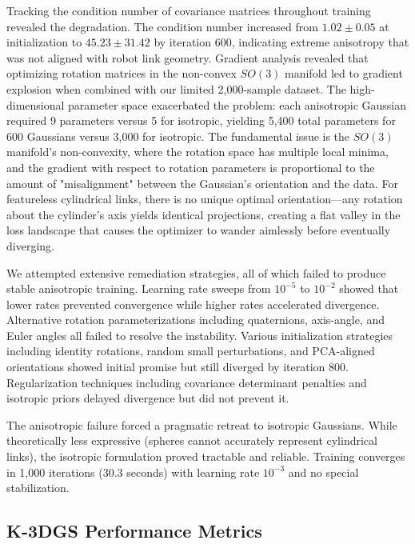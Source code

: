 \documentclass[12pt,a4paper,oneside]{report}
\begin{document}
Tracking the condition number of covariance matrices throughout training revealed the degradation. The condition number increased from $1.02 \pm 0.05$ at initialization to $45.23 \pm 31.42$ by iteration 600, indicating extreme anisotropy that was not aligned with robot link geometry. Gradient analysis revealed that optimizing rotation matrices in the non-convex $SO(3)$ manifold led to gradient explosion when combined with our limited 2,000-sample dataset. The high-dimensional parameter space exacerbated the problem: each anisotropic Gaussian required 9 parameters versus 5 for isotropic, yielding 5,400 total parameters for 600 Gaussians versus 3,000 for isotropic. The fundamental issue is the $SO(3)$ manifold's non-convexity, where the rotation space has multiple local minima, and the gradient with respect to rotation parameters is proportional to the amount of "misalignment" between the Gaussian's orientation and the data. For featureless cylindrical links, there is no unique optimal orientation—any rotation about the cylinder's axis yields identical projections, creating a flat valley in the loss landscape that causes the optimizer to wander aimlessly before eventually diverging.

We attempted extensive remediation strategies, all of which failed to produce stable anisotropic training. Learning rate sweeps from $10^{-5}$ to $10^{-2}$ showed that lower rates prevented convergence while higher rates accelerated divergence. Alternative rotation parameterizations including quaternions, axis-angle, and Euler angles all failed to resolve the instability. Various initialization strategies including identity rotations, random small perturbations, and PCA-aligned orientations showed initial promise but still diverged by iteration 800. Regularization techniques including covariance determinant penalties and isotropic priors delayed divergence but did not prevent it.

The anisotropic failure forced a pragmatic retreat to isotropic Gaussians. While theoretically less expressive (spheres cannot accurately represent cylindrical links), the isotropic formulation proved tractable and reliable. Training converges in 1,000 iterations (30.3 seconds) with learning rate $10^{-3}$ and no special stabilization.

\subsection{K-3DGS Performance Metrics}
\label{subsec:k_3dgs_performance_metrics}
\end{document}
